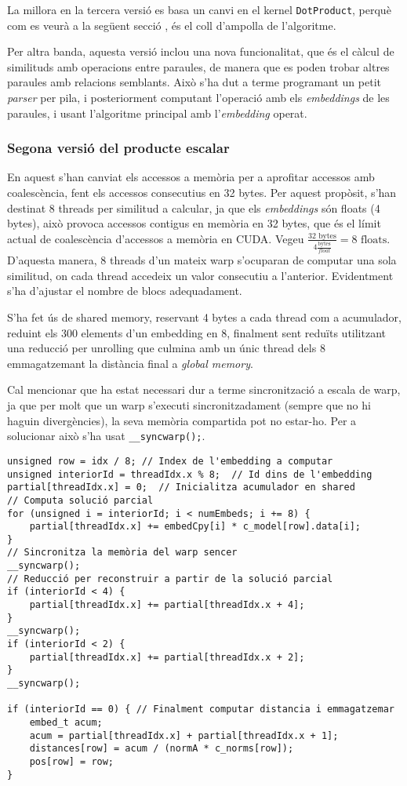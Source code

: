 \documentclass[catalan,10pt,a4paper]{article}
\begin{document}
La millora en la tercera versió es basa un canvi en el kernel \verb|DotProduct|, perquè com es veurà a la següent secció , és el coll d'ampolla de l'algoritme. 

Per altra banda, aquesta versió inclou una nova funcionalitat, que és el càlcul de similituds amb operacions entre paraules, de manera que es poden trobar altres paraules amb relacions semblants. Això s'ha dut a terme programant un petit \textit{parser} per pila, i posteriorment computant l'operació amb els \textit{embeddings} de les paraules, i usant l'algoritme principal amb l'\textit{embedding} operat. 

\subsubsection*{Segona versió del producte escalar}
En aquest s'han canviat els accessos a memòria per a aprofitar accessos amb coalescència, fent els accessos consecutius en 32 bytes. Per aquest propòsit, s'han destinat 8 threads per similitud a calcular, ja que els \textit{embeddings} són floats (4 bytes), això provoca accessos contigus en memòria en 32 bytes, que és el límit actual de coalescència d'accessos a memòria en CUDA. Vegeu $\frac{32 \text{ bytes}}{4 \frac{\text{bytes}}{float}} = 8 \text{ floats}$. D'aquesta manera, 8 threads d'un mateix warp s'ocuparan de computar una sola similitud, on cada thread accedeix un valor consecutiu a l'anterior. Evidentment s'ha d'ajustar el nombre de blocs adequadament.

S'ha fet ús de shared memory, reservant 4 bytes a cada thread com a acumulador, reduint els 300 elements d'un embedding en 8, finalment sent reduïts utilitzant una reducció per unrolling que culmina amb un únic thread dels 8 emmagatzemant la distància final a \textit{global memory}.

Cal mencionar que ha estat necessari dur a terme sincronització a escala de warp, ja que per molt que un warp s'executi sincronitzadament (sempre que no hi haguin divergències), la seva memòria compartida pot no estar-ho. Per a solucionar això s'ha usat \verb|__syncwarp();|.
\begin{verbatim}
unsigned row = idx / 8; // Index de l'embedding a computar
unsigned interiorId = threadIdx.x % 8;  // Id dins de l'embedding
partial[threadIdx.x] = 0;  // Inicialitza acumulador en shared
// Computa solució parcial
for (unsigned i = interiorId; i < numEmbeds; i += 8) {
	partial[threadIdx.x] += embedCpy[i] * c_model[row].data[i];
}
// Sincronitza la memòria del warp sencer
__syncwarp();
// Reducció per reconstruir a partir de la solució parcial
if (interiorId < 4) {
	partial[threadIdx.x] += partial[threadIdx.x + 4];
}
__syncwarp();
if (interiorId < 2) {
	partial[threadIdx.x] += partial[threadIdx.x + 2];
}
__syncwarp();

if (interiorId == 0) { // Finalment computar distancia i emmagatzemar
	embed_t acum;
	acum = partial[threadIdx.x] + partial[threadIdx.x + 1];
	distances[row] = acum / (normA * c_norms[row]);
	pos[row] = row;
}
\end{verbatim}
\end{document}
